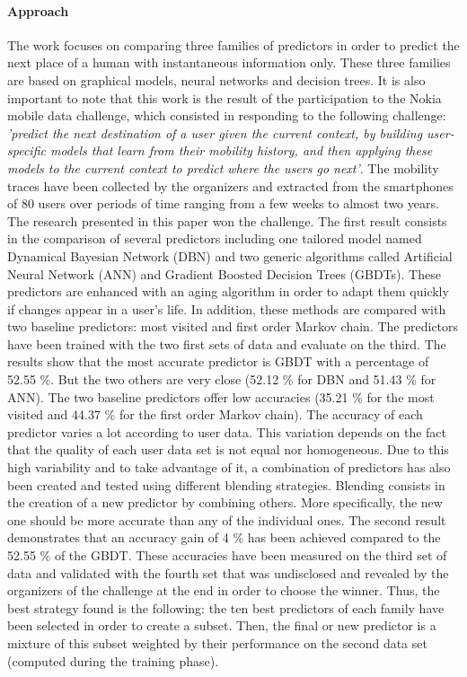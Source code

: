 \paragraph{Approach}

The work focuses on comparing three families of predictors in order to predict the next place of a human with instantaneous information only. These three families are based on graphical models, neural networks and decision trees. It is also important to note that this work is the result of the participation to the Nokia mobile data challenge, which consisted in responding to the following challenge: \emph{'predict the next destination of a user given the current context, by building user-specific models that learn from their mobility history, and then applying these models to the current context to predict where the users go next'}. The mobility traces have been collected by the organizers and extracted from the smartphones of 80 users over periods of time ranging from a few weeks to almost two years. The research presented in this paper won the challenge.
The first result consists in the comparison of several predictors including one tailored model named Dynamical Bayesian Network (DBN) and two generic algorithms called Artificial Neural Network (ANN) and Gradient Boosted Decision Trees (GBDTs). These predictors are enhanced with an aging algorithm in order to adapt them quickly if changes appear in a user's life. In addition, these methods are compared with two baseline predictors: most visited and first order Markov chain. The predictors have been trained with the two first sets of data and evaluate on the third. The results show that the most accurate predictor is GBDT with a percentage of 52.55 \%. But the two others are very close (52.12 \% for DBN and 51.43 \% for ANN). The two baseline predictors offer low accuracies (35.21 \% for the most visited and 44.37 \% for the first order Markov chain). The accuracy of each predictor varies a lot according to user data. This variation depends on the fact that the quality of each user data set is not equal nor homogeneous.
Due to this high variability and to take advantage of it, a combination of predictors has also been created and tested using different blending strategies. Blending consists in the creation of a new predictor by combining others. More specifically, the new one should be more accurate than any of the individual ones. The second result demonstrates that an accuracy gain of 4 \% has been achieved compared to the 52.55 \% of the GBDT. These accuracies have been measured on the third set of data and validated with the fourth set that was undisclosed and revealed by the organizers of the challenge at the end in order to choose the winner. Thus, the best strategy found is the following:  the ten best predictors of each family have been selected in order to create a subset. Then, the final or new predictor is a mixture of this subset weighted by their performance on the second data set (computed during the training phase).

